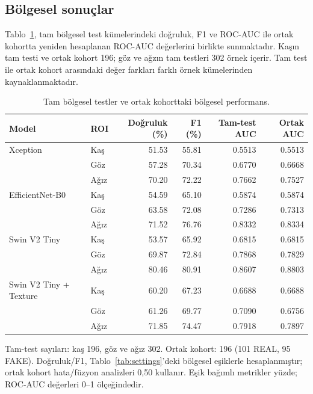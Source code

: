 \documentclass[a4paper]{elektr}
\begin{document}
\subsection{Bölgesel sonuçlar}
Tablo~\ref{tab:regional}, tam bölgesel test kümelerindeki doğruluk, F1 ve ROC-AUC ile ortak kohortta yeniden hesaplanan ROC-AUC değerlerini birlikte sunmaktadır. Kaşın tam testi ve ortak kohort 196; göz ve ağzın tam testleri 302 örnek içerir. Tam test ile ortak kohort arasındaki değer farkları farklı örnek kümelerinden kaynaklanmaktadır.
\begin{table}[!htbp]\centering\begin{minipage}{15.8cm}
\caption{Tam bölgesel testler ve ortak kohorttaki bölgesel performans.}\label{tab:regional}
\centering \small
\begin{tabular}{llrrrr}\toprule
Model & ROI & Doğruluk (\%) & F1 (\%) & Tam-test AUC & Ortak AUC \\\midrule
Xception & Kaş & 51.53 & 55.81 & 0.5513 & 0.5513 \\
 & Göz & 57.28 & 70.34 & 0.6770 & 0.6668 \\
 & Ağız & 70.20 & 72.22 & 0.7662 & 0.7527 \\
EfficientNet-B0 & Kaş & 54.59 & 65.10 & 0.5874 & 0.5874 \\
 & Göz & 63.58 & 72.08 & 0.7286 & 0.7313 \\
 & Ağız & 71.52 & 76.76 & 0.8332 & 0.8334 \\
Swin V2 Tiny & Kaş & 53.57 & 65.92 & 0.6815 & 0.6815 \\
 & Göz & 69.87 & 72.84 & 0.7868 & 0.7829 \\
 & Ağız & 80.46 & 80.91 & 0.8607 & 0.8803 \\
Swin V2 Tiny + Texture & Kaş & 60.20 & 67.23 & 0.6688 & 0.6688 \\
 & Göz & 61.26 & 69.77 & 0.7090 & 0.6756 \\
 & Ağız & 71.85 & 74.47 & 0.7918 & 0.7897 \\
\bottomrule\end{tabular}
\par\smallskip\begin{minipage}{\linewidth}\small Tam-test sayıları: kaş 196, göz ve ağız 302. Ortak kohort: 196 (101 REAL, 95 FAKE). Doğruluk/F1, Tablo~\ref{tab:settings}’deki bölgesel eşiklerle hesaplanmıştır; ortak kohort hata/füzyon analizleri 0,50 kullanır. Eşik bağımlı metrikler yüzde; ROC-AUC değerleri 0--1 ölçeğindedir.\end{minipage}
\end{minipage}\end{table}
\end{document}
